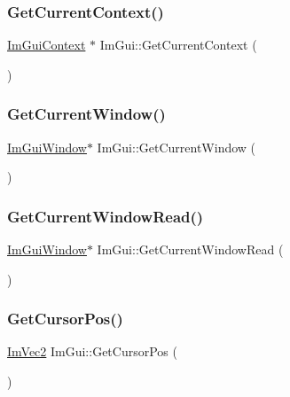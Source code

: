 \subsubsection{\texorpdfstring{Get\+Current\+Context()}{GetCurrentContext()}}
{\footnotesize\ttfamily \hyperlink{struct_im_gui_context}{Im\+Gui\+Context} $\ast$ Im\+Gui\+::\+Get\+Current\+Context (\begin{DoxyParamCaption}{ }\end{DoxyParamCaption})}

\hypertarget{namespace_im_gui_a7ceba68eca2b09fb6bf1ad88037e6203}{}\label{namespace_im_gui_a7ceba68eca2b09fb6bf1ad88037e6203} 
\subsubsection{\texorpdfstring{Get\+Current\+Window()}{GetCurrentWindow()}}
{\footnotesize\ttfamily \hyperlink{struct_im_gui_window}{Im\+Gui\+Window}$\ast$ Im\+Gui\+::\+Get\+Current\+Window (\begin{DoxyParamCaption}{ }\end{DoxyParamCaption})}

\hypertarget{namespace_im_gui_a408f9ddac92f8629a7e273ced5f8c3aa}{}\label{namespace_im_gui_a408f9ddac92f8629a7e273ced5f8c3aa} 
\subsubsection{\texorpdfstring{Get\+Current\+Window\+Read()}{GetCurrentWindowRead()}}
{\footnotesize\ttfamily \hyperlink{struct_im_gui_window}{Im\+Gui\+Window}$\ast$ Im\+Gui\+::\+Get\+Current\+Window\+Read (\begin{DoxyParamCaption}{ }\end{DoxyParamCaption})}

\hypertarget{namespace_im_gui_a2fa4eb57e0f73b90e8edcd226a0cc7d5}{}\label{namespace_im_gui_a2fa4eb57e0f73b90e8edcd226a0cc7d5} 
\subsubsection{\texorpdfstring{Get\+Cursor\+Pos()}{GetCursorPos()}}
{\footnotesize\ttfamily \hyperlink{struct_im_vec2}{Im\+Vec2} Im\+Gui\+::\+Get\+Cursor\+Pos (\begin{DoxyParamCaption}{ }\end{DoxyParamCaption})}

